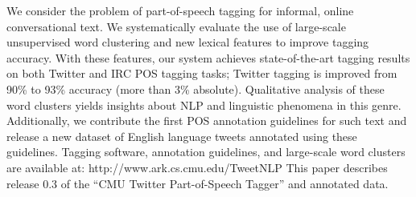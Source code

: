 We consider the problem of part-of-speech tagging for informal, online conversational text.  We systematically evaluate the use of large-scale
 unsupervised word clustering and new lexical features to improve tagging
 accuracy. With these features, our system achieves state-of-the-art tagging
 results on both Twitter and IRC POS tagging tasks; Twitter tagging is improved
 from 90\% to 93\% accuracy (more than 3\% absolute).  Qualitative analysis of
 these word clusters yields insights about NLP and linguistic phenomena in this
 genre.                                Additionally, we contribute the first POS
 annotation
 guidelines
 for
 such text and release a new dataset of English language tweets annotated using
 these guidelines.  
 Tagging software, annotation guidelines, and large-scale word clusters are
 available at: http://www.ark.cs.cmu.edu/TweetNLP
 This paper describes release 0.3 of the ``CMU Twitter Part-of-Speech Tagger'' and
 annotated data.

